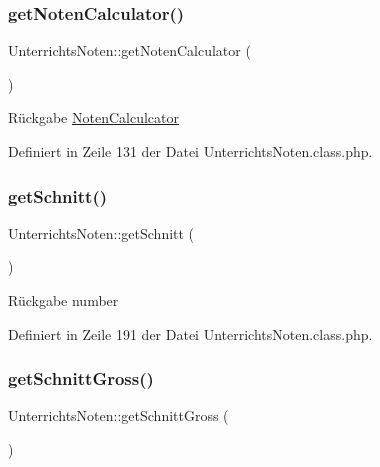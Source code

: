\subsubsection{\texorpdfstring{get\+Noten\+Calculator()}{getNotenCalculator()}}
{\footnotesize\ttfamily Unterrichts\+Noten\+::get\+Noten\+Calculator (\begin{DoxyParamCaption}{ }\end{DoxyParamCaption})}

\begin{DoxyReturn}{Rückgabe}
\mbox{\hyperlink{class_noten_calculcator}{Noten\+Calculcator}} 
\end{DoxyReturn}


Definiert in Zeile 131 der Datei Unterrichts\+Noten.\+class.\+php.

\mbox{\label{class_unterrichts_noten_ab821ecae7151fb0d918924e1a6ba606f}} 
\subsubsection{\texorpdfstring{get\+Schnitt()}{getSchnitt()}}
{\footnotesize\ttfamily Unterrichts\+Noten\+::get\+Schnitt (\begin{DoxyParamCaption}{ }\end{DoxyParamCaption})}

\begin{DoxyReturn}{Rückgabe}
number 
\end{DoxyReturn}


Definiert in Zeile 191 der Datei Unterrichts\+Noten.\+class.\+php.

\mbox{\label{class_unterrichts_noten_acc388f21e1d9451766801a09a75faf96}} 
\subsubsection{\texorpdfstring{get\+Schnitt\+Gross()}{getSchnittGross()}}
{\footnotesize\ttfamily Unterrichts\+Noten\+::get\+Schnitt\+Gross (\begin{DoxyParamCaption}{ }\end{DoxyParamCaption})}

